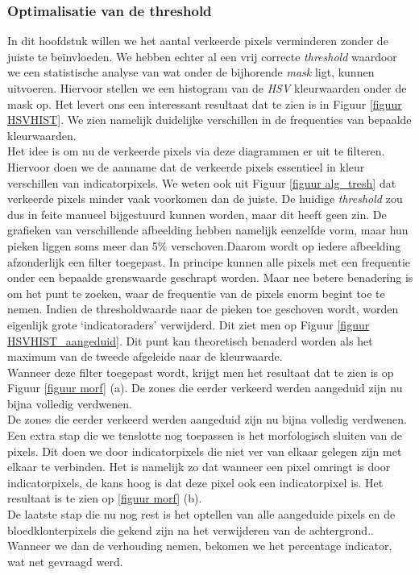 \documentclass[a4paper,kulak]{kulakarticle}
\begin{document}
\subsubsection{Optimalisatie van de threshold} \label{additional_filter}
In dit hoofdstuk willen we het aantal verkeerde pixels verminderen zonder de juiste te beïnvloeden. We hebben echter al een vrij correcte \textit{threshold} waardoor we een statistische analyse van wat onder de bijhorende \textit{mask} ligt, kunnen uitvoeren. Hiervoor stellen we een histogram van de \textit{HSV} kleurwaarden onder de mask op. Het levert ons een interessant resultaat dat te zien is in Figuur  \ref{figuur HSVHIST}. We zien namelijk duidelijke verschillen in de frequenties van bepaalde kleurwaarden.\\
Het idee is om nu de verkeerde pixels via deze diagrammen er uit te filteren. Hiervoor doen we de aanname dat de verkeerde pixels essentieel in kleur verschillen van indicatorpixels. We weten ook uit Figuur \ref{figuur alg_tresh} dat verkeerde pixels minder vaak voorkomen dan de juiste. De huidige \textit{threshold} zou dus in feite manueel bijgestuurd kunnen worden, maar dit heeft geen zin. De grafieken van verschillende afbeelding hebben namelijk eenzelfde vorm, maar hun pieken liggen soms meer dan 5\% verschoven.Daarom wordt op iedere afbeelding afzonderlijk een filter toegepast. In principe kunnen alle pixels met een frequentie onder een bepaalde grenswaarde geschrapt worden. Maar nee betere benadering is om het punt te zoeken, waar de frequentie van de pixels enorm begint toe te nemen. Indien de thresholdwaarde naar de pieken toe geschoven wordt, worden eigenlijk grote ‘indicatoraders’ verwijderd. Dit ziet men op Figuur \ref{figuur HSVHIST_aangeduid}. Dit punt kan theoretisch benaderd worden als het maximum van de tweede afgeleide naar de kleurwaarde. \\
Wanneer deze filter toegepast wordt, krijgt men het resultaat dat te zien is op Figuur \ref{figuur morf} (a). De zones die eerder verkeerd werden aangeduid zijn nu bijna volledig verdwenen.\\
De zones die eerder verkeerd werden aangeduid zijn nu bijna volledig verdwenen.\\
Een extra stap die we tenslotte nog toepassen is het morfologisch sluiten van de pixels. Dit doen we door indicatorpixels die niet ver van elkaar gelegen zijn met elkaar te verbinden. Het is namelijk zo dat wanneer een pixel omringt is door indicatorpixels, de kans hoog is dat deze pixel ook een indicatorpixel is. Het resultaat is te zien op \ref{figuur morf} (b).\\
De laatste stap die nu nog rest is het optellen van alle aangeduide pixels en de bloedklonterpixels die gekend zijn na het verwijderen van de achtergrond.. Wanneer we dan de verhouding nemen, bekomen we het percentage indicator, wat net gevraagd werd.
\end{document}
